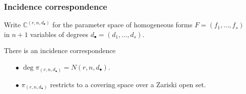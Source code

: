 \documentclass{beamer}
\theoremstyle{definition}
\begin{document}
\begin{frame}
\frametitle{Incidence correspondence}
Write $\mathbb{C}^{(r,n,d_\bullet)}$ for the parameter space of homogeneous forms $F = (f_1,\dotsc,f_s)$ in $n+1$ variables of degrees $d_\bullet = (d_1,\dotsc,d_s)$.

There is an incidence correspondence

\vspace{-.3cm}

\begin{center}
\end{center}

\vspace{-.45cm}

\begin{enumerate}
\item[$\bullet$] $\deg \pi_{(r,n,d_\bullet)} = N(r,n,d_\bullet)$.

\item[$\bullet$] $\pi_{(r,n,d_\bullet)}$ restricts to a covering space over a Zariski open set.
\end{enumerate}
\end{frame}
\end{document}
